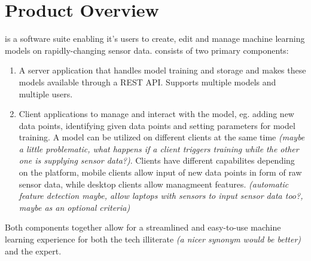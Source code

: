 \section{Product Overview}

{\pseProjectName} is a software suite enabling it's users to create, edit and manage machine learning models on rapidly-changing sensor data. {\pseProjectName} consists of two primary components:

\begin{enumerate}
    \item A server application that handles model training and storage and makes these models available through a REST API. Supports multiple models and multiple users.
    \item Client applications to manage and interact with the model, eg. adding new data points, identifying given data points and setting parameters for model training. A model can be utilized on different clients at the same time \emph{(maybe a little problematic, what happens if a client triggers training while the other one is supplying sensor data?)}. Clients have different capabilites depending on the platform, mobile clients allow input of new data points in form of raw sensor data, while desktop clients allow managmeent features. \emph{(automatic feature detection maybe, allow laptops with sensors to input sensor data too?, maybe as an optional criteria)}
\end{enumerate}

Both components together allow for a streamlined and easy-to-use machine learning experience for both the tech illiterate \emph{(a nicer synonym would be better)} and the expert.